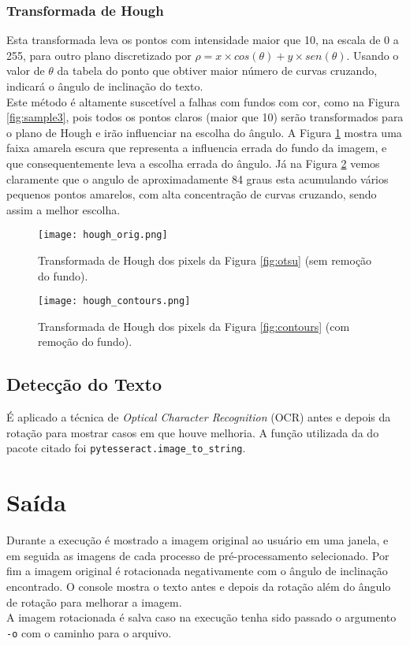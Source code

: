\documentclass[10pt,twocolumn,letterpaper]{article}
\begin{document}
\subsubsection*{Transformada de Hough}
Esta transformada leva os pontos com intensidade maior que 10, na escala de 0 a 255, para outro plano discretizado por $\rho = x\times cos(\theta) + y\times sen(\theta)$. Usando o valor de $\theta$ da tabela do ponto que obtiver maior número de curvas cruzando, indicará o ângulo de inclinação do texto.\\
Este método é altamente suscetível a falhas com fundos com cor, como na Figura \ref{fig:sample3}, pois todos os pontos claros (maior que 10) serão transformados para o plano de Hough e irão influenciar na escolha do ângulo. A Figura \ref{fig:hough_orig} mostra uma faixa amarela escura que representa a influencia errada do fundo da imagem, e que consequentemente leva a escolha errada do ângulo. Já na Figura \ref{fig:hough_contours} vemos claramente que o angulo de aproximadamente 84 graus esta acumulando vários pequenos pontos amarelos, com alta concentração de curvas cruzando, sendo assim a melhor escolha.
\begin{figure}
    \centering
    \texttt{[image: hough\_orig.png]}
    \caption{Transformada de Hough dos pixels da Figura \ref{fig:otsu} (sem remoção do fundo).\label{fig:hough_orig}}
\end{figure}
\begin{figure}
    \centering
    \texttt{[image: hough\_contours.png]}
    \caption{Transformada de Hough dos pixels da Figura \ref{fig:contours} (com remoção do fundo).\label{fig:hough_contours}}
\end{figure}
\subsection{Detecção do Texto}
É aplicado a técnica de \emph{Optical Character Recognition} (OCR) antes e depois da rotação para mostrar casos em que houve melhoria. A função utilizada da do pacote citado foi  \texttt{pytesseract.image\_to\_string}.

\section{Saída}
Durante a execução é mostrado a imagem original ao usuário em uma janela, e em seguida as imagens de cada processo de pré-processamento selecionado.
Por fim a imagem original é rotacionada negativamente com o ângulo de inclinação encontrado.
O console mostra o texto antes e depois da rotação além do ângulo de rotação para melhorar a imagem.\\
A imagem rotacionada é salva caso na execução tenha sido passado o argumento \texttt{-o} com o caminho para o arquivo.
\end{document}
